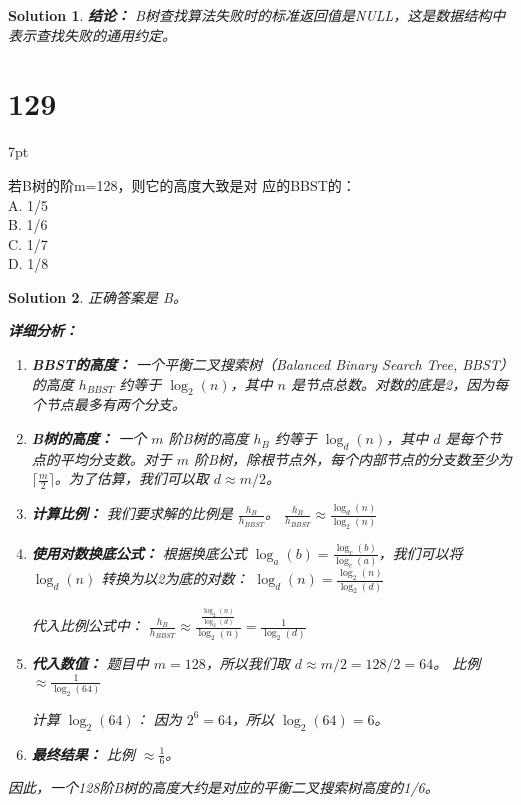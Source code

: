 \documentclass[UTF8]{report}
\newtheorem{solution}{Solution}
\theoremstyle{MyLineTheoremStyle} %
\theoremstyle{MyBlockTheoremStyle} %
\theoremstyle{MySubsubsectionStyle} %
\newenvironment{graybox}{%
        \def\FrameCommand{%
        \hspace{1pt}%
        {\color{gray}\small \vrule width 2pt}%
        {\color{graybox_color}\vrule width 4pt}%
        \colorbox{graybox_color}%
        }%
        \MakeFramed{\advance\hsize-\width\FrameRestore}%
        \noindent\hspace{-4.55pt}%
        \begin{adjustwidth}{}{7pt}%
        \vspace{2pt}\vspace{2pt}%
        }
        {%
        \vspace{2pt}\end{adjustwidth}\endMakeFramed%
        }
\begin{document}
\begin{solution}
\textbf{结论：}
B树查找算法失败时的标准返回值是NULL，这是数据结构中表示查找失败的通用约定。
\end{solution}

\section*{129}
\begin{graybox}
若B树的阶m=128，则它的高度大致是对
应的BBST的：\\
A. 1/5\\
B. 1/6\\
C. 1/7\\
D. 1/8
\end{graybox}

\begin{solution}
正确答案是 B。

\textbf{详细分析：}

\begin{enumerate}
    \item \textbf{BBST的高度：}
    一个平衡二叉搜索树（Balanced Binary Search Tree, BBST）的高度 $h_{BBST}$ 约等于 $\log_2(n)$，其中 $n$ 是节点总数。对数的底是2，因为每个节点最多有两个分支。

    \item \textbf{B树的高度：}
    一个 $m$ 阶B树的高度 $h_{B}$ 约等于 $\log_d(n)$，其中 $d$ 是每个节点的平均分支数。对于 $m$ 阶B树，除根节点外，每个内部节点的分支数至少为 $\lceil \frac{m}{2} \rceil$。为了估算，我们可以取 $d \approx m/2$。

    \item \textbf{计算比例：}
    我们要求解的比例是 $\frac{h_{B}}{h_{BBST}}$。
    $\frac{h_{B}}{h_{BBST}} \approx \frac{\log_d(n)}{\log_2(n)}$

    \item \textbf{使用对数换底公式：}
    根据换底公式 $\log_a(b) = \frac{\log_c(b)}{\log_c(a)}$，我们可以将 $\log_d(n)$ 转换为以2为底的对数：
    $\log_d(n) = \frac{\log_2(n)}{\log_2(d)}$

    代入比例公式中：
    $\frac{h_{B}}{h_{BBST}} \approx \frac{\frac{\log_2(n)}{\log_2(d)}}{\log_2(n)} = \frac{1}{\log_2(d)}$

    \item \textbf{代入数值：}
    题目中 $m=128$，所以我们取 $d \approx m/2 = 128/2 = 64$。
    比例 $\approx \frac{1}{\log_2(64)}$

    计算 $\log_2(64)$：
    因为 $2^6 = 64$，所以 $\log_2(64) = 6$。

    \item \textbf{最终结果：}
    比例 $\approx \frac{1}{6}$。
\end{enumerate}

因此，一个128阶B树的高度大约是对应的平衡二叉搜索树高度的1/6。
\end{solution}
\end{document}
